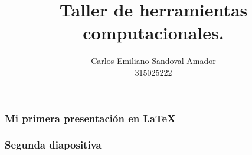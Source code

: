 \documentclass{beamer}
\title{Taller de herramientas computacionales.}
\author{Carlos Emiliano Sandoval Amador \\ 315025222}
\begin{document}
	\maketitle
	\begin{frame}
		\frametitle{Mi primera presentación en LaTeX}
		
		
	\end{frame}
\begin{frame}

\frametitle{Segunda diapositiva}
	
\end{frame}
\end{document}
